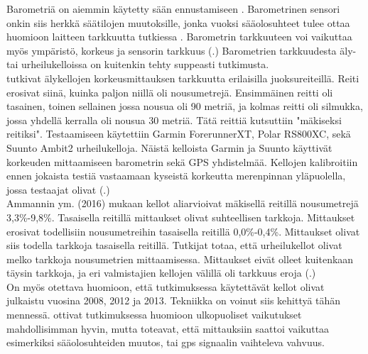 \documentclass[utf8,bachelor,finnish]{bachelor}
\begin{document}
        Barometriä on aiemmin käytetty sään ennustamiseen \parencite{manivannan_challenges_2020}.
         Barometrinen sensori onkin siis herkkä säätilojen muutoksille, jonka vuoksi sääolosuhteet tulee ottaa huomioon laitteen tarkkuutta tutkiessa \parencite{manivannan_challenges_2020, ammann_accuracy_2016}.
          Barometrin tarkkuuteen voi vaikuttaa myös ympäristö, korkeus ja sensorin tarkkuus (\cite{manivannan_challenges_2020}.)
           Barometrien tarkkuudesta äly- tai urheilukelloissa on kuitenkin tehty suppeasti tutkimusta.\\
           
    \textcite{ammann_accuracy_2016} tutkivat älykellojen korkeusmittauksen tarkkuutta erilaisilla juoksureiteillä. Reiti erosivat siinä, kuinka paljon niillä oli nousumetrejä.
     Ensimmäinen reitti oli tasainen, toinen sellainen jossa nousua oli 90 metriä, ja kolmas reitti oli silmukka, jossa yhdellä kerralla oli nousua 30 metriä.
      Tätä reittiä kutsuttiin "mäkiseksi reitiksi".
       Testaamiseen käytettiin Garmin ForerunnerXT, Polar RS800XC, sekä Suunto Ambit2 urheilukelloja. Näistä kelloista Garmin ja
        Suunto käyttivät korkeuden mittaamiseen barometrin sekä GPS yhdistelmää.
         Kellojen kalibroitiin ennen jokaista testiä vastaamaan kyseistä korkeutta merenpinnan yläpuolella, jossa testaajat olivat (\cite{ammann_accuracy_2016}.)\\

    Ammannin ym. (2016) mukaan kellot aliarvioivat mäkisellä reitillä nousumetrejä 3,3\%-9,8\%. Tasaisella reitillä mittaukset olivat suhteellisen tarkkoja.
     Mittaukset erosivat todellisiin nousumetreihin tasaisella reitillä 0,0\%-0,4\%. Mittaukset olivat siis todella tarkkoja tasaisella reitillä.
      Tutkijat totaa, että urheilukellot olivat melko tarkkoja nousumetrien mittaamisessa. Mittaukset eivät olleet kuitenkaan
       täysin tarkkoja, ja eri valmistajien kellojen välillä oli tarkkuus eroja (\cite{ammann_accuracy_2016}.)\\
       
    On myös otettava huomioon, että tutkimuksessa käytettävät kellot olivat julkaistu vuosina 2008, 2012 ja 2013. Tekniikka on voinut siis kehittyä tähän mennessä. 
     \textcite{ammann_accuracy_2016} ottivat tutkimuksessa huomioon ulkopuoliset vaikutukset mahdollisimman hyvin, mutta toteavat, että mittauksiin
      saattoi vaikuttaa esimerkiksi sääolosuhteiden muutos, tai gps signaalin vaihteleva vahvuus.\\
\end{document}
